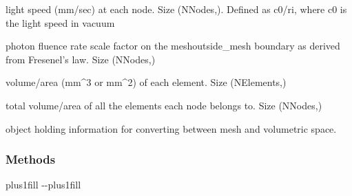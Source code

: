 \documentclass[letterpaper,10pt,english]{sphinxmanual}
\begin{document}
\begin{fulllineitems}
\begin{description}
\sphinxAtStartPar
light speed (mm/sec) at each node.  Size (NNodes,). Defined as c0/ri, where c0 is the light speed in vacuum

\sphinxAtStartPar
photon fluence rate scale factor on the mesh\sphinxhyphen{}outside\_mesh boundary as derived from Fresenel’s law. Size (NNodes,)

\sphinxAtStartPar
volume/area (mm\textasciicircum{}3 or mm\textasciicircum{}2) of each element. Size (NElements,)

\sphinxAtStartPar
total volume/area of all the elements each node belongs to. Size (NNodes,)

\sphinxAtStartPar
object holding information for converting between mesh and volumetric space.

\end{description}

\begin{fulllineitems}
\label{\detokenize{_autosummary/nirfasterff.base.mesh.mesh:nirfasterff.base.mesh.mesh.__init__}}
\pysigstartsignatures
\pysiglinewithargsret
{}
{}
{}
\pysigstopsignatures
\end{fulllineitems}

\subsubsection*{Methods}


\begin{savenotes}
\sphinxatlongtablestart
\sphinxthistablewithglobalstyle
\sphinxthistablewithnovlinesstyle
\makeatletter
  \LTleft \@totalleftmargin plus1fill
  \LTright\dimexpr\columnwidth-\@totalleftmargin-\linewidth\relax plus1fill
\makeatother
\begin{longtable}{}
\sphinxtoprule
\endfirsthead

\\
\sphinxtoprule
\endhead

\sphinxbottomrule
{}\\
\endfoot


\end{longtable}
\end{savenotes}
\end{fulllineitems}
\end{document}
